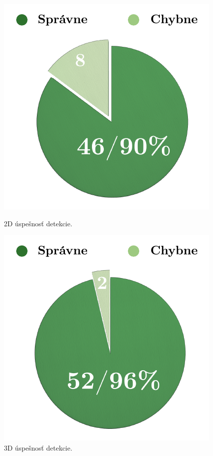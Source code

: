 \begin{figure}[H]
  \centering
  \begin{minipage}[b]{0.43\textwidth}
    \includegraphics[width=\textwidth]{images/2D_graph_medart}
    \caption{2D úspešnosť detekcie.}
  \end{minipage}
  \hfill
  \begin{minipage}[b]{0.43\textwidth}
    \includegraphics[width=\textwidth]{images/3D_graph_medart}
    \caption{3D úspešnosť detekcie.}
  \end{minipage}
\end{figure}

